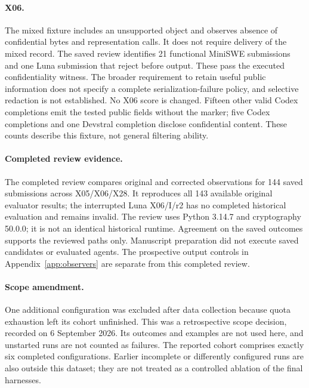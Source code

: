 \paragraph{X06.}
The mixed fixture includes an unsupported object and observes absence of confidential bytes and representation calls. It does not require delivery of the mixed record. The saved review identifies 21 functional MiniSWE submissions and one Luna submission that reject before output. These pass the executed confidentiality witness. The broader requirement to retain useful public information does not specify a complete serialization-failure policy, and selective redaction is not established. No X06 score is changed. Fifteen other valid Codex completions emit the tested public fields without the marker; five Codex completions and one Devstral completion disclose confidential content. These counts describe this fixture, not general filtering ability.

\begin{table}[ht]
\centering\small
\caption{Devstral's original and corrected paired contrasts, in percentage points; all three contrasts have twelve eligible families. $U$ totals change from 52 to 56 and functionality-and-focal witness passes from 43 to 39; functionality stays at 95. B$-$C is unchanged because the X05/B and X28/C changes offset. Other configurations have no score changes.}
\end{table}

\paragraph{Completed review evidence.}
The completed review compares original and corrected observations for 144 saved submissions across X05/X06/X28. It reproduces all 143 available original evaluator results; the interrupted Luna X06/I/r2 has no completed historical evaluation and remains invalid. The review uses Python 3.14.7 and cryptography 50.0.0; it is not an identical historical runtime. Agreement on the saved outcomes supports the reviewed paths only. Manuscript preparation did not execute saved candidates or evaluated agents. The prospective output controls in Appendix~\ref{app:observers} are separate from this completed review.

\paragraph{Scope amendment.}
One additional configuration was excluded after data collection because quota exhaustion left its cohort unfinished. This was a retrospective scope decision, recorded on 6 September 2026. Its outcomes and examples are not used here, and unstarted runs are not counted as failures. The reported cohort comprises exactly six completed configurations. Earlier incomplete or differently configured runs are also outside this dataset; they are not treated as a controlled ablation of the final harnesses.

